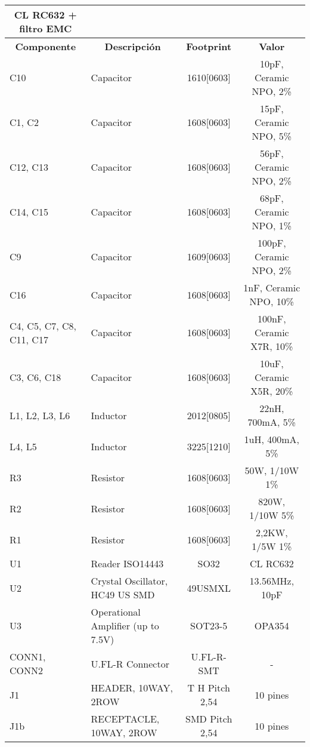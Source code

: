 \begin{table}[htbp]
\begin{center}
\begin{tabular}{|l|p{3cm}|c|c|}
\hline
\multicolumn{1}{|c|}{\textbf{CL RC632 + filtro EMC}} &  &  &  \\ \hline
\multicolumn{1}{|c|}{\textbf{Componente}} & \multicolumn{1}{c|}{\textbf{Descripción}} & \textbf{ Footprint} & \textbf{Valor} \\ \hline
C10 & Capacitor & 1610[0603] & 10pF, Ceramic NPO, 2\% \\ \hline
C1, C2 & Capacitor & 1608[0603] & 15pF, Ceramic NPO, 5\% \\ \hline
C12, C13 & Capacitor & 1608[0603] & 56pF, Ceramic NPO, 2\% \\ \hline
C14, C15 & Capacitor & 1608[0603] & 68pF, Ceramic NPO, 1\% \\ \hline
C9 & Capacitor & 1609[0603] & 100pF, Ceramic NPO,  2\% \\ \hline
C16 & Capacitor & 1608[0603] & 1nF, Ceramic NPO, 10\% \\ \hline
C4, C5, C7, C8, C11, C17 & Capacitor & 1608[0603] & 100nF, Ceramic X7R, 10\% \\ \hline
C3, C6, C18 & Capacitor & 1608[0603] & 10uF, Ceramic X5R, 20\% \\ \hline
L1, L2, L3, L6 & Inductor & 2012[0805] & 22nH, 700mA, 5\% \\ \hline
L4, L5 & Inductor & 3225[1210] & 1uH, 400mA, 5\% \\ \hline
R3 & Resistor & 1608[0603] & 50W, 1/10W   1\% \\ \hline
R2 & Resistor & 1608[0603] & 820W, 1/10W   5\% \\ \hline
R1 & Resistor & 1608[0603] & 2,2KW, 1/5W   1\% \\ \hline
U1 & Reader ISO14443 & SO32 & CL RC632 \\ \hline
U2 & Crystal Oscillator, HC49 US SMD & 49USMXL & 13.56MHz, 10pF \\ \hline
U3 & Operational Amplifier (up to 7.5V) & SOT23-5 & OPA354 \\ \hline
CONN1, CONN2 & U.FL-R Connector & U.FL-R-SMT & - \\ \hline
J1 & HEADER, 10WAY, 2ROW & T H Pitch 2,54 & 10 pines \\ \hline
J1b & RECEPTACLE, 10WAY, 2ROW & SMD  Pitch 2,54 & 10 pines \\ \hline
\end{tabular}
\end{center}
\caption{}
\label{}
\end{table}

  
  

